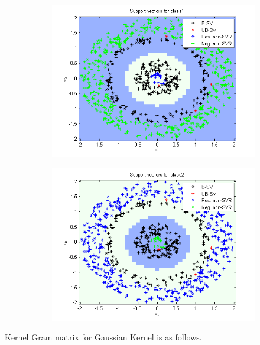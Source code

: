 \documentclass{article}
\begin{document}
\begin{figure}
\begin{subfigure}{.5\textwidth}
  \centering
  \includegraphics[width=.8\linewidth]{Classification/1b/nu_g/sv1}
 
\end{subfigure}%
\begin{subfigure}{.5\textwidth}
  \centering
  \includegraphics[width=.8\linewidth]{Classification/1b/nu_g/sv2}
  
\end{subfigure}
\end{figure}
\newpage
Kernel Gram matrix for Gaussian Kernel is as follows.
\end{document}

